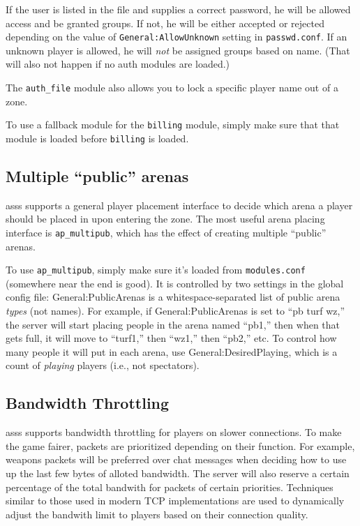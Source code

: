 \documentclass{article}
\newcommand{\asss}{asss}
\begin{document}
If the user is listed in the file and supplies a correct password, he
will be allowed access and be granted groups. If not, he will be either
accepted or rejected depending on the value of
\verb/General:AllowUnknown/ setting in \verb/passwd.conf/. If an unknown
player is allowed, he will \emph{not} be assigned groups based on name.
(That will also not happen if no auth modules are loaded.)

The \verb/auth_file/ module also allows you to lock a specific player
name out of a zone.

To use a fallback module for the \verb/billing/ module, simply make sure
that that module is loaded before \verb/billing/ is loaded.


\subsection{Multiple ``public'' arenas}

\asss{} supports a general player placement interface to decide which
arena a player should be placed in upon entering the zone. The most
useful arena placing interface is \verb/ap_multipub/, which has the
effect of creating multiple ``public'' arenas.

To use \verb/ap_multipub/, simply make sure it's loaded from
\verb/modules.conf/ (somewhere near the end is good). It is controlled
by two settings in the global config file: General:PublicArenas is a
whitespace-separated list of public arena \emph{types} (not names). For
example, if General:PublicArenas is set to ``pb turf wz,'' the server
will start placing people in the arena named ``pb1,'' then when that
gets full, it will move to ``turf1,'' then ``wz1,'' then ``pb2,'' etc.
To control how many people it will put in each arena, use
General:DesiredPlaying, which is a count of \emph{playing} players
(i.e., not spectators).


\subsection{Bandwidth Throttling}

\asss{} supports bandwidth throttling for players on slower connections.
To make the game fairer, packets are prioritized depending on their
function. For example, weapons packets will be preferred over chat
messages when deciding how to use up the last few bytes of alloted
bandwidth. The server will also reserve a certain percentage of the
total bandwith for packets of certain priorities. Techniques similar to
those used in modern TCP implementations are used to dynamically adjust
the bandwith limit to players based on their connection quality.
\end{document}
